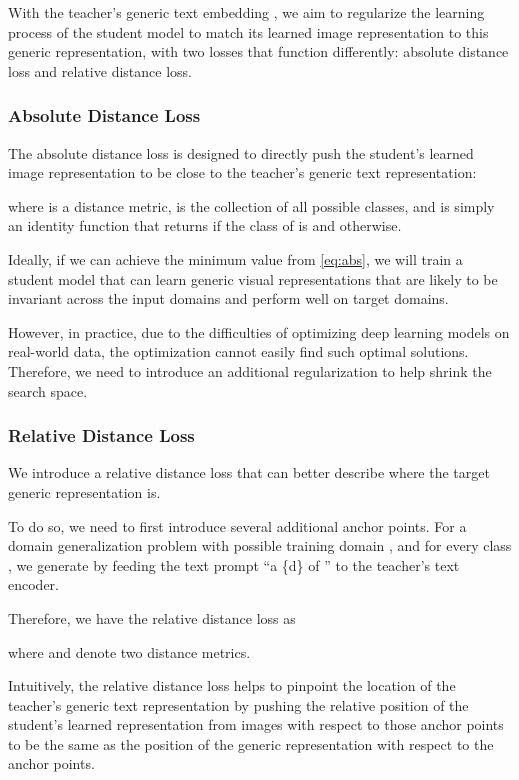 \documentclass[10pt,twocolumn,letterpaper]{article}
\begin{document}
With the teacher's generic text embedding , we aim to regularize the learning process of the student model to match its learned image representation to this generic representation, with two losses that function differently: absolute distance loss and relative distance loss. 

\subsubsection{Absolute Distance Loss}

The absolute distance loss is designed to directly push the student's learned image representation to be close to the teacher's generic text representation:

where  is a distance metric,  is the collection of all possible classes, and  is simply an identity function that returns  if the class of  is  and  otherwise. 

Ideally, if we can achieve the minimum value from \eqref{eq:abs}, we will train a student model that can learn generic 
visual representations that are likely to be invariant across the input 
domains and perform well on target domains. 

However, in practice, due to the difficulties of optimizing deep learning models on real-world data, the optimization cannot easily find such optimal solutions. Therefore, we need to introduce an 
additional regularization to help shrink the search space. 

\subsubsection{Relative Distance Loss}
We introduce a relative distance loss that can better describe where the target generic representation is. 

To do so, we need to first introduce several additional anchor points. For a domain generalization problem with possible training domain , 
and for every class , 
we generate  
by feeding the text prompt 
``a \{d\} of '' to the teacher's text encoder. 

Therefore, we have the relative distance loss as 

where  and  denote two distance metrics. 

Intuitively, the relative distance loss helps to pinpoint the location 
of the teacher's generic text representation by pushing the relative position 
of the student's learned representation from images with respect to those anchor points to be the same as the position of the generic representation with respect to the anchor points. 
\end{document}
